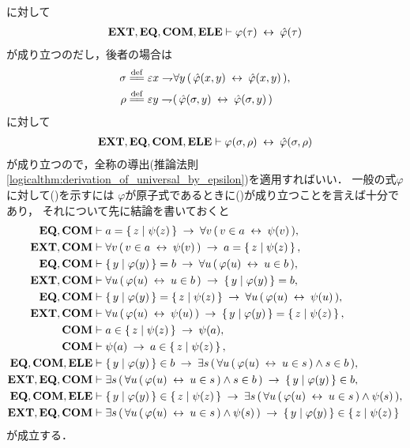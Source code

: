 	に対して
	\begin{align}
		\EXTAX,\EQAX,\COMAX,\ELEAX \vdash \varphi(\tau) \lrarrow \hat{\varphi}(\tau)
	\end{align}
	が成り立つのだし，後者の場合は
	\begin{align}
		\sigma &\defeq \varepsilon x \negation \forall y\, (\, \hat{\varphi}(x,y) \lrarrow \hat{\varphi}(x,y)\, ), \\
		\rho &\defeq \varepsilon y \negation (\, \hat{\varphi}(\sigma,y) \lrarrow \hat{\varphi}(\sigma,y)\, )
	\end{align}
	に対して
	\begin{align}
		\EXTAX,\EQAX,\COMAX,\ELEAX \vdash \varphi(\sigma,\rho) \lrarrow \hat{\varphi}(\sigma,\rho)
	\end{align}
	が成り立つので，全称の導出(推論法則\ref{logicalthm:derivation_of_universal_by_epsilon})を適用すればいい．
	一般の式$\varphi$に対して()を示すには
	$\varphi$が原子式であるときに()が成り立つことを言えば十分であり，
	それについて先に結論を書いておくと
	\begin{align}
		\EQAX,\COMAX &\vdash a = \Set{z}{\psi(z)} 
			\rarrow \forall v\, (\, v \in a \lrarrow \psi(v)\, ), \\
		\EXTAX,\COMAX &\vdash \forall v\, (\, v \in a \lrarrow \psi(v)\, )
			\rarrow a = \Set{z}{\psi(z)}, \\
		\EQAX,\COMAX &\vdash \Set{y}{\varphi(y)} = b 
			\rarrow \forall u\, (\, \varphi(u) \lrarrow u \in b\, ), \\
		\EXTAX,\COMAX &\vdash \forall u\, (\, \varphi(u) \lrarrow u \in b\, )
			\rarrow \Set{y}{\varphi(y)} = b, \\
		\EQAX,\COMAX &\vdash \Set{y}{\varphi(y)} = \Set{z}{\psi(z)}
			\rarrow \forall u\, (\, \varphi(u) \lrarrow \psi(u)\, ), \\
		\EXTAX,\COMAX &\vdash \forall u\, (\, \varphi(u) \lrarrow \psi(u)\, )
			\rarrow \Set{y}{\varphi(y)} = \Set{z}{\psi(z)}, \\
		\COMAX &\vdash a \in \Set{z}{\psi(z)} \rarrow \psi(a), \\
		\COMAX &\vdash \psi(a) \rarrow a \in \Set{z}{\psi(z)}, \\
		\EQAX,\COMAX,\ELEAX &\vdash \Set{y}{\varphi(y)} \in b
			\rarrow \exists s\, (\, \forall u\, (\, \varphi(u) \lrarrow u \in s\, ) \wedge s \in b\, ), \\
		\EXTAX,\EQAX,\COMAX &\vdash \exists s\, (\, \forall u\, (\, \varphi(u) \lrarrow u \in s\, ) \wedge s \in b\, ) \rarrow \Set{y}{\varphi(y)} \in b, \\
		\EQAX,\COMAX,\ELEAX &\vdash \Set{y}{\varphi(y)} \in \Set{z}{\psi(z)}
			\rarrow \exists s\, (\, \forall u\, (\, \varphi(u) \lrarrow u \in s\, ) \wedge \psi(s)\, ), \\
		\EXTAX,\EQAX,\COMAX &\vdash \exists s\, (\, \forall u\, (\, \varphi(u) \lrarrow u \in s\, ) \wedge \psi(s)\, ) \rarrow \Set{y}{\varphi(y)} \in \Set{z}{\psi(z)}
	\end{align}
	が成立する．
	
